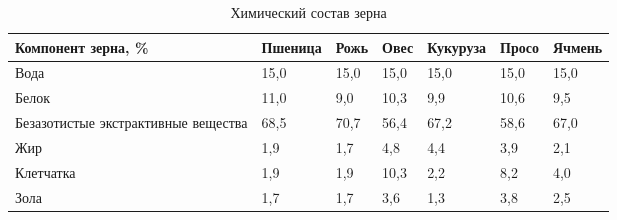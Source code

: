 \begin{longtable}{|X|Y|Y|Y|Y|Y|Y|}
\caption{\label{tab:grain_chem}Химический состав зерна}
\tabularnewline
\hline
Компонент зерна, \% & Пшеница & Рожь  & Овес  & Кукуруза & Просо & Ячмень \\
\hline
Вода  & 15,0  & 15,0  & 15,0  & 15,0  & 15,0  & 15,0 \\
\hline
Белок & 11,0  & 9,0   & 10,3  & 9,9   & 10,6  & 9,5 \\
\hline
Безазотистые экстрактивные вещества & 68,5  & 70,7  & 56,4  & 67,2  & 58,6  & 67,0 \\
\hline
Жир   & 1,9   & 1,7   & 4,8   & 4,4   & 3,9   & 2,1 \\
\hline
Клетчатка & 1,9   & 1,9   & 10,3  & 2,2   & 8,2   & 4,0 \\
\hline
Зола  & 1,7   & 1,7   & 3,6   & 1,3   & 3,8   & 2,5 \\
\hline
\end{longtable}%